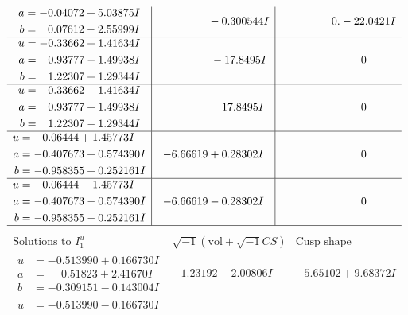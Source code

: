 \documentclass[1p]{elsarticle_modified}
\theoremstyle{definition}
\newcommand{\I}{\sqrt{-1}}
\begin{document}
$$\begin{array}{c|c|c}
\begin{aligned}
a &= -0.04072 + 5.03875 I \\
b &= \phantom{-}0.07612 - 2.55999 I\end{aligned}
 & \phantom{-0.000000 } -0.300544 I & \phantom{-0.000000 } 0. - 22.0421 I \\ \hline\begin{aligned}
u &= -0.33662 + 1.41634 I \\
a &= \phantom{-}0.93777 - 1.49938 I \\
b &= \phantom{-}1.22307 + 1.29344 I\end{aligned}
 & \phantom{-0.000000 } -17.8495 I & \phantom{-0.000000 } 0 \\ \hline\begin{aligned}
u &= -0.33662 - 1.41634 I \\
a &= \phantom{-}0.93777 + 1.49938 I \\
b &= \phantom{-}1.22307 - 1.29344 I\end{aligned}
 & \phantom{-0.000000 -}17.8495 I & \phantom{-0.000000 } 0 \\ \hline\begin{aligned}
u &= -0.06444 + 1.45773 I \\
a &= -0.407673 + 0.574390 I \\
b &= -0.958355 + 0.252161 I\end{aligned}
 & -6.66619 + 0.28302 I & \phantom{-0.000000 } 0 \\ \hline\begin{aligned}
u &= -0.06444 - 1.45773 I \\
a &= -0.407673 - 0.574390 I \\
b &= -0.958355 - 0.252161 I\end{aligned}
 & -6.66619 - 0.28302 I & \phantom{-0.000000 } 0\\
 \hline 
 \end{array}$$\newpage$$\begin{array}{c|c|c}  
\text{Solutions to }I^u_{1}& \I (\text{vol} + \sqrt{-1}CS) & \text{Cusp shape}\\
 \hline 
\begin{aligned}
u &= -0.513990 + 0.166730 I \\
a &= \phantom{-}0.51823 + 2.41670 I \\
b &= -0.309151 - 0.143004 I\end{aligned}
 & -1.23192 - 2.00806 I & -5.65102 + 9.68372 I \\ \hline\begin{aligned}
u &= -0.513990 - 0.166730 I \\

\end{aligned}
\end{array}$$
\end{document}
